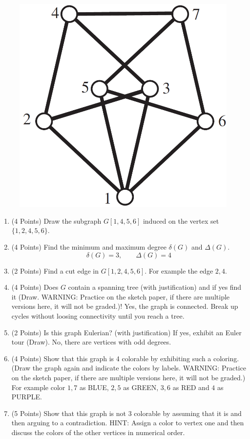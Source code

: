 \documentclass[12pt]{article}
\begin{document}
\begin{enumerate}
\begin{figure}[h]
\centering
\includegraphics[scale=0.3]{Euler.png}
\end{figure}

\begin{enumerate}
\item (4 Points) Draw the subgraph $G[1,4,5,6]$ induced on the vertex set $\{1,2,4,5,6\}$.\vspace{3cm}
\item (4 Points) Find the minimum and maximum degree $\delta(G)$ and $\Delta(G)$.
\[
\delta(G)= 3,\qquad \Delta(G)=4
\]
\item (2 Points) Find a cut edge in $G[1,2,4,5,6]$.\vspace{1cm}
For example the edge ${2,4}$.
\item (4 Points) Does $G$ contain a spanning tree (with justification) and if yes find it (Draw. WARNING: Practice on the sketch paper, if there are multiple versions here, it will not be graded.)!\vspace{5cm}
Yes, the graph is connected. Break up cycles without loosing connectivity until you reach a tree.
\item (2 Points) Is this graph Eulerian? (with justification) If yes, exhibit an Euler tour (Draw).\vspace{1cm}
No, there are vertices with odd degrees.
\item (4 Points) Show that this graph is 4 colorable by exhibiting such a coloring. (Draw the graph again and indicate the colors by labels. WARNING: Practice on the sketch paper, if there are multiple versions here, it will not be graded.)\vspace{1cm} 
For example color $1,7$ as BLUE, $2,5$ as GREEN, $3,6$ as RED and $4$ as PURPLE.
\item (5 Points) Show that this graph is not $3$ colorable by assuming that it is and then arguing to a contradiction. HINT: Assign a color to vertex one and then discuss the colors of the other vertices in numerical order.


\end{enumerate}
\end{enumerate}
\end{document}
